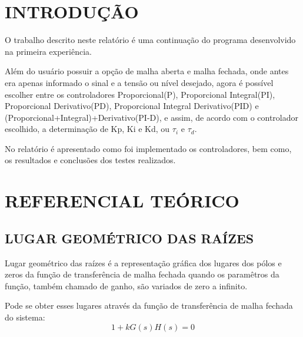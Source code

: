 \documentclass[a4paper,12pt]{article}
\begin{document}
\newpage


\thispagestyle{main}

\section{INTRODUÇÃO}

\begin{flushleft}
\hspace{4ex}O trabalho descrito neste relatório é uma continuação do programa desenvolvido na primeira experiência.

\hspace{4ex}Além do usuário possuir a opção de malha aberta e malha fechada, onde antes era apenas informado o sinal e a tensão ou nível desejado, agora é possível escolher entre os controladores Proporcional(P), Proporcional Integral(PI), Proporcional Derivativo(PD), Proporcional Integral Derivativo(PID) e (Proporcional+Integral)+Derivativo(PI-D), e assim, de acordo com o controlador escolhido, a determinação de Kp, Ki e Kd, ou    $\tau_i$ e $\tau_d.$

\hspace{4ex}No relatório é apresentado como foi implementado os controladores, bem como, os resultados e conclusões dos testes realizados.
\end{flushleft}

\newpage


\thispagestyle{main}

\section{REFERENCIAL TEÓRICO}

\subsection{LUGAR GEOMÉTRICO DAS RAÍZES}
\hspace{4ex}Lugar geométrico das raízes é a representação gráfica dos lugares dos pólos e zeros da função de transferência de malha fechada quando os paramêtros da função, também chamado de ganho, são variados de zero a infinito.
 
Pode se obter esses lugares através da função de transferência de malha fechada do sistema:
\begin{equation}\label{eq:1}
1 + kG(s)H(s) = 0
\end{equation}
\end{document}
